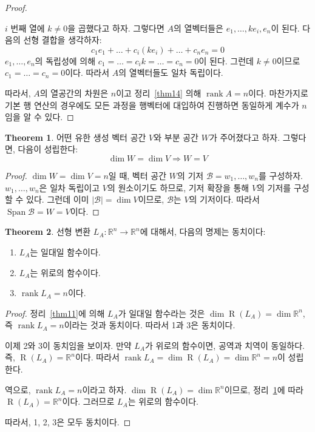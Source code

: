 \documentclass[unfonts,oneside,a4paper]{oblivoir}
\theoremstyle{definition}
\theoremstyle{theorem}
\newtheorem{theorem}{Theorem}
\theoremstyle{remark}
\theoremstyle{remark}
\theoremstyle{remark}
\theoremstyle{remark}
\renewcommand{\vec}[1]{\bm{\mathit{#1}}}
\newcommand{\vecz}{\bm{\mathrm{0}}}
\DeclareMathOperator{\Span}{Span}
\DeclareMathOperator{\Range}{R}
\DeclareMathOperator{\rank}{rank}
\begin{document}
\begin{proof}
\begin{enumerate}
            $i$ 번째 열에 $k \neq 0$을 곱했다고 하자.
            그렇다면 $A$의 열벡터들은 $\vec e_1, \dots, k \vec e_i, \vec e_n$이 된다.
            다음의 선형 결합을 생각하자:
            \begin{equation*}
                c_1 \vec e_1 + \dots + c_i (k \vec e_i) + \dots + c_n \vec e_n = \vecz
            \end{equation*}
            $\vec e_1, \dots, \vec e_n$의 독립성에 의해 $c_1 = \dots = c_i k = \dots = c_n = 0$이 된다.
            그런데 $k \neq 0$이므로 $c_1 = \dots = c_n = 0$이다.
            따라서 $A$의 열벡터들도 일차 독립이다.
    \end{enumerate}
    따라서, $A$의 열공간의 차원은 $n$이고 정리~\ref{thm14} 의해 $\rank A = n$이다.
    마찬가지로 기본 행 연산의 경우에도 모든 과정을 행벡터에 대입하여 진행하면 동일하게 계수가 $n$임을 알 수 있다.
\end{proof}

\begin{theorem}\label{thm17}
    어떤 유한 생성 벡터 공간 $V$와 부분 공간 $W$가 주어졌다고 하자.
    그렇다면, 다음이 성립한다:
    \begin{equation*}
        \dim W = \dim V \Rightarrow W = V
    \end{equation*}
\end{theorem}

\begin{proof}
    $\dim W = \dim V = n$일 때, 벡터 공간 $W$의 기저 $\mathcal B = \vec w_1, \dots, \vec w_n$를 구성하자.
    $\vec w_1, \dots, \vec w_n$은 일차 독립이고 $V$의 원소이기도 하므로, 기저 확장을 통해 $V$의 기저를 구성할 수 있다.
    그런데 이미 $|\mathcal B| = \dim V$이므로, $\mathcal B$는 $V$의 기저이다.
    따라서 $\Span \mathcal B = W = V$이다.
\end{proof}

\begin{theorem}
    선형 변환 $L_A: \mathbb R^n \rightarrow \mathbb R^n$에 대해서, 다음의 명제는 동치이다:
    \begin{enumerate}
        \item $L_A$는 일대일 함수이다.
        \item $L_A$는 위로의 함수이다.
        \item $\rank L_A = n$이다.
    \end{enumerate}
\end{theorem}

\begin{proof}
    정리~\ref{thm11}에 의해 $L_A$가 일대일 함수라는 것은 $\dim \Range(L_A) = \dim \mathbb R^n$, 즉 $\rank L_A = n$이라는 것과 동치이다.
    따라서 1과 3은 동치이다.

    이제 2와 3이 동치임을 보이자.
    만약 $L_A$가 위로의 함수이면, 공역과 치역이 동일하다.
    즉, $\Range(L_A) = \mathbb R^n$이다.
    따라서 $\rank L_A = \dim \Range(L_A) = \dim \mathbb R^n = n$이 성립한다.

    역으로, $\rank L_A = n$이라고 하자.
    $\dim \Range(L_A) = \dim \mathbb R^n$이므로, 정리~\ref{thm17}에 따라 $\Range(L_A) = \mathbb R^n$이다.
    그러므로 $L_A$는 위로의 함수이다.

    따라서, 1, 2, 3은 모두 동치이다.
\end{proof}
\end{document}
